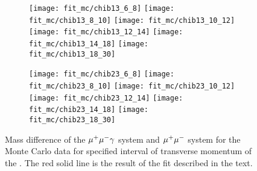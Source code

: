 \begin{figure}[ht]
\begin{subfigure}[b]{\textwidth}
      \centering
      \texttt{[image: fit\_mc/chib13\_6\_8]}
      \texttt{[image: fit\_mc/chib13\_8\_10]}
      \texttt{[image: fit\_mc/chib13\_10\_12]}
      \texttt{[image: fit\_mc/chib13\_12\_14]}
      \texttt{[image: fit\_mc/chib13\_14\_18]}
      \texttt{[image: fit\_mc/chib13\_18\_30]}
      \caption{\chiboneThreeP}
      \label{fig:fit_mc_chiboneThreeP}
    \end{subfigure}
    \begin{subfigure}[b]{\textwidth}
      \centering
      \texttt{[image: fit\_mc/chib23\_6\_8]}
      \texttt{[image: fit\_mc/chib23\_8\_10]}
      \texttt{[image: fit\_mc/chib23\_10\_12]}
      \texttt{[image: fit\_mc/chib23\_12\_14]}
      \texttt{[image: fit\_mc/chib23\_14\_18]}
      \texttt{[image: fit\_mc/chib23\_18\_30]}
      \caption{\chibtwoThreeP}
      \label{fig:fit_mc_chibtwoThreeP}
    \end{subfigure}        
  \caption{
    \small  Mass difference of the $\mu^+\mu^- \gamma$ system and $\mu^+\mu^-$ system for the 
    Monte Carlo data for specified interval of transverse momentum of the \OneS. The red
    solid line is the result of the fit described in the text.
  }
  \label{fig:fit_mc}
\end{figure}